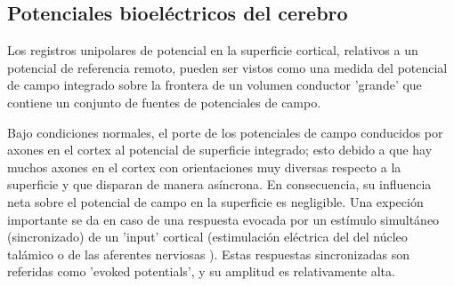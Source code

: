 
\subsection{Potenciales bioel\'ectricos del cerebro}

Los registros unipolares de potencial en la superficie cortical, relativos a un potencial de
referencia remoto, pueden ser vistos como una medida del potencial de campo integrado sobre la
frontera de un volumen conductor 'grande' que contiene un conjunto de fuentes de potenciales de 
campo.

Bajo condiciones normales, el porte de los potenciales de campo conducidos por axones en el cortex
al potencial de superficie integrado; esto debido a que hay muchos axones en el cortex con
orientaciones muy diversas respecto a la superficie y que disparan de manera as\'incrona.
En consecuencia, su influencia neta sobre el potencial de campo en la superficie es negligible.
Una expeci\'on importante se da en caso de una respuesta evocada por un est\'imulo
simult\'aneo (sincronizado) de un 'input' cortical (estimulaci\'on el\'ectrica del del n\'ucleo 
tal\'amico o de las aferentes nerviosas ).
Estas respuestas sincronizadas son referidas como 'evoked potentials', y su amplitud es
relativamente alta.



